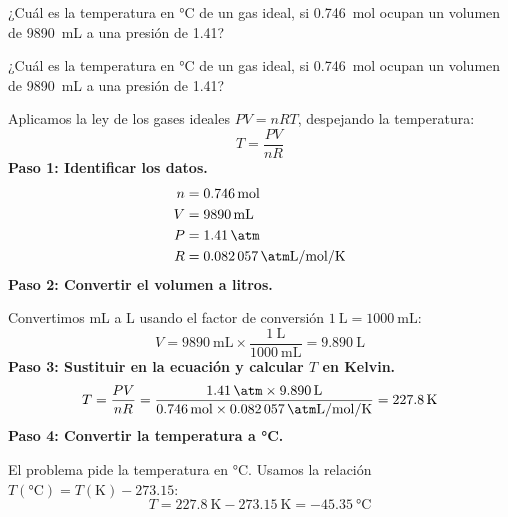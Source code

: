 \begin{exercise}
    ¿Cuál es la temperatura en \unit{\degreeCelsius} de un gas ideal, si \qty{0.746}{\mol} ocupan un volumen de \qty{9890}{\mL} a una presión de \qty{1.41}{\atmosphere}?
    \begin{solu}
        ¿Cuál es la temperatura en \unit{\degreeCelsius} de un gas ideal, si \qty{0.746}{\mol} ocupan un volumen de \qty{9890}{\mL} a una presión de \qty{1.41}{\atmosphere}?

        Aplicamos la ley de los gases ideales $PV = nRT$, despejando la temperatura:
        \begin{equation*}
            T = \frac{PV}{nR}
        \end{equation*}
        \textbf{Paso 1: Identificar los datos.}
        \begin{align*}
            n &= \qty{0.746}{\mol} \\
            V &= \qty{9890}{\mL} \\
            P &= \qty{1.41}{\atm} \\
            R &= \qty{0.082057}{\atm\liter\per\mol\per\kelvin}
        \end{align*}
        \textbf{Paso 2: Convertir el volumen a litros.}

        Convertimos mL a L usando el factor de conversión $\qty{1}{\liter} = \qty{1000}{\mL}$:
        \begin{equation*}
            V = \qty{9890}{\mL} \times \frac{\qty{1}{\liter}}{\qty{1000}{\mL}} = \qty{9.890}{\liter}
        \end{equation*}
        \textbf{Paso 3: Sustituir en la ecuación y calcular $T$ en Kelvin.}
        \begin{equation*}
            T = \frac{PV}{nR} = \frac{\qty{1.41}{\atm} \times \qty{9.890}{\liter}}{\qty{0.746}{\mol} \times \qty{0.082057}{\atm\liter\per\mol\per\kelvin}} = \qty{227.8}{\kelvin}
        \end{equation*}
        \textbf{Paso 4: Convertir la temperatura a \unit{\degreeCelsius}.}

        El problema pide la temperatura en \unit{\degreeCelsius}. Usamos la relación $T(\unit{\degreeCelsius}) = T(\unit{\kelvin}) - 273.15$:
        \begin{equation*}
            T = \qty{227.8}{\kelvin} - \qty{273.15}{\kelvin} = \boxed{\qty{-45.35}{\degreeCelsius}}
        \end{equation*}
    \end{solu}
\end{exercise}
